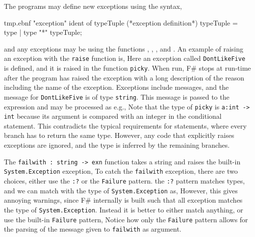 The programs may define new exceptions using the syntax,
%
\begin{verbatimwrite}{tmp.ebnf}
"exception" ident of typeTuple (*exception definition*)
typeTuple = type | type "*" typeTuple;
\end{verbatimwrite}
%
and any exceptions may be  using the functions , , , and . An example of raising an exception with the \lstinline!raise! function is,
%
%
Here an exception called \lstinline!DontLikeFive! is defined, and it is raised in the function \lstinline!picky!. When run, F\# stops at run-time after the program has raised the exception with a long description of the reason including the name of the exception. Exceptions include messages, and the message for \lstinline!DontLikeFive! is of type \lstinline!string!. This message is passed to the  expression and may be processed as e.g., 
%
%
Note that the type of \lstinline!picky! is \lstinline!a:int -> int! because its argument is compared with an integer in the conditional statement. This contradicts the typical requirements for  statements, where every branch has to return the same type. However, any code that explicitly raises exceptions are ignored, and the type is inferred by the remaining branches.

The \lstinline!failwith : string -> exn! function takes a string and raises the built-in \lstinline!System.Exception! exception, 
%
%
To catch the \lstinline!failwith! exception, there are two choices, either use the \lstinline!:?! or the \lstinline!Failure! pattern. the \lstinline!:?! pattern matches types, and we can match with the type of \lstinline!System.Exception! as,
%
%
However, this gives annoying warnings, since F\# internally is built such that all exception matches the type of \lstinline!System.Exception!. Instead it is better to either match anything,
%
%
or use the built-in \lstinline!Failure! pattern,
%
%
Notice how only the \lstinline!Failure! pattern allows for the parsing of the message given to \lstinline!failwith! as argument.

